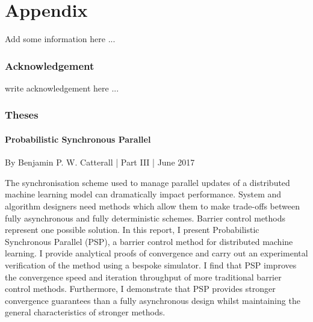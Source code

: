 \part{Appendix}

Add some information here ...


\hypertarget{Acknowledgement}{%
\section{Acknowledgement}\label{acknowledgement}}

write acknowledgement here ...

\newpage



\hypertarget{Theses}{%
\section{Theses}\label{theses}}

\hypertarget{Probabilistic Synchronous Parallel}{%
\subsection{Probabilistic Synchronous Parallel}\label{theses-psp}}

By Benjamin P. W. Catterall | Part III | June 2017

The synchronisation scheme used to manage parallel updates of a distributed machine learning model can dramatically impact performance. System and algorithm designers need methods which allow them to make trade-offs between fully asynchronous and fully deterministic schemes. Barrier control methods represent one possible solution. In this report, I present Probabilistic Synchronous Parallel (PSP), a barrier control method for distributed machine learning. I provide analytical proofs of convergence and carry out an experimental verification of the method using a bespoke simulator. I find that PSP improves the convergence speed and iteration throughput of more traditional barrier control methods. Furthermore, I demonstrate that PSP provides stronger convergence guarantees than a fully asynchronous design whilst maintaining the general characteristics of stronger methods.


